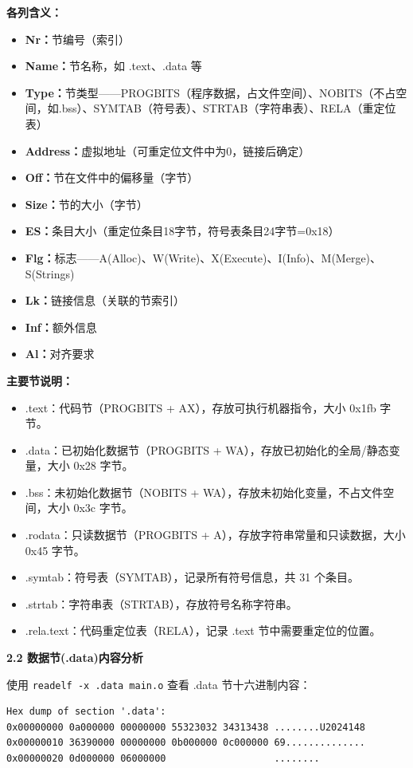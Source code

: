\documentclass[12pt,a4paper]{ctexart}
\begin{document}
\textbf{各列含义：}
\begin{itemize}[nosep]
    \item \textbf{Nr：}节编号（索引）
    \item \textbf{Name：}节名称，如 .text、.data 等
    \item \textbf{Type：}节类型——PROGBITS（程序数据，占文件空间）、NOBITS（不占空间，如.bss）、SYMTAB（符号表）、STRTAB（字符串表）、RELA（重定位表）
    \item \textbf{Address：}虚拟地址（可重定位文件中为0，链接后确定）
    \item \textbf{Off：}节在文件中的偏移量（字节）
    \item \textbf{Size：}节的大小（字节）
    \item \textbf{ES：}条目大小（重定位条目18字节，符号表条目24字节=0x18）
    \item \textbf{Flg：}标志——A(Alloc)、W(Write)、X(Execute)、I(Info)、M(Merge)、S(Strings)
    \item \textbf{Lk：}链接信息（关联的节索引）
    \item \textbf{Inf：}额外信息
    \item \textbf{Al：}对齐要求
\end{itemize}

\textbf{主要节说明：}
\begin{itemize}[nosep]
    \item .text：代码节（PROGBITS + AX），存放可执行机器指令，大小 0x1fb 字节。
    \item .data：已初始化数据节（PROGBITS + WA），存放已初始化的全局/静态变量，大小 0x28 字节。
    \item .bss：未初始化数据节（NOBITS + WA），存放未初始化变量，不占文件空间，大小 0x3c 字节。
    \item .rodata：只读数据节（PROGBITS + A），存放字符串常量和只读数据，大小 0x45 字节。
    \item .symtab：符号表（SYMTAB），记录所有符号信息，共 31 个条目。
    \item .strtab：字符串表（STRTAB），存放符号名称字符串。
    \item .rela.text：代码重定位表（RELA），记录 .text 节中需要重定位的位置。
\end{itemize}

\textbf{2.2 数据节(.data)内容分析}

使用 \texttt{readelf -x .data main.o} 查看 .data 节十六进制内容：

\begin{lstlisting}
Hex dump of section '.data':
0x00000000 0a000000 00000000 55323032 34313438 ........U2024148
0x00000010 36390000 00000000 0b000000 0c000000 69..............
0x00000020 0d000000 06000000                   ........
\end{lstlisting}
\end{document}
